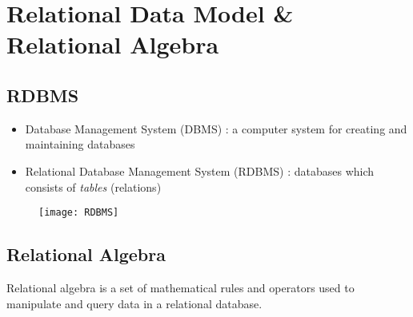 \chapter{Relational Data Model \& Relational Algebra} %

\section{RDBMS}

\begin{itemize}
    \item Database Management System (DBMS) : a computer system for creating and maintaining databases
    \item Relational Database Management System (RDBMS) : databases which consists of \textit{tables} (relations)
\end{itemize}

\begin{figure}[H]
    \centering
    \texttt{[image: RDBMS]}
\end{figure}

\begin{Parallel}{0.47\textwidth}{0.47\textwidth}

\ParallelPar
\end{Parallel}

\section{Relational Algebra}

Relational algebra is a set of mathematical rules and operators used to manipulate and query data in a relational database.

